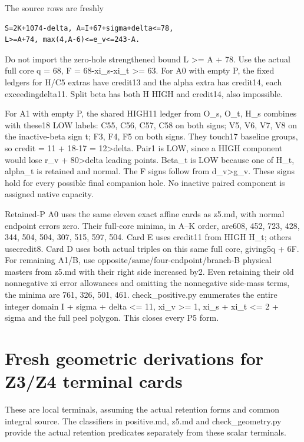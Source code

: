 \documentclass[11pt,a4paper]{article}
\begin{document}
The source rows are freshly

\begin{verbatim}
S=2K+1074-delta, A=I+67+sigma+delta<=78,
L>=A+74, max(4,A-6)<=e_v<=243-A.
\end{verbatim}

Do not import the zero-hole strengthened bound L \textgreater= A + 78.
Use the actual full core q = 68, F = 68-xi\_s-xi\_t \textgreater= 63.
For A0 with empty P, the fixed ledgers for H/C5 extras have credit13 and
the alpha extra has credit14, each exceedingdelta11. Split beta has both
H HIGH and credit14, also impossible.

For A1 with empty P, the shared HIGH11 ledger from O\_s, O\_t, H\_s
combines with these18 LOW labels: C55, C56, C57, C58 on both signs; V5,
V6, V7, V8 on the inactive-beta sign t; F3, F4, F5 on both signs. They
touch17 baseline groups, so credit = 11 + 18-17 = 12\textgreater delta.
Pair1 is LOW, since a HIGH component would lose r\_v +
80\textgreater delta leading points. Beta\_t is LOW because one of H\_t,
alpha\_t is retained and normal. The F signs follow from
d\_v\textgreater g\_v. These signs hold for every possible final
companion hole. No inactive paired component is assigned native
capacity.

Retained-P A0 uses the same eleven exact affine cards as z5.md, with
normal endpoint errors zero. Their full-core minima, in A--K order,
are608, 452, 723, 428, 344, 504, 504, 307, 515, 597, 504. Card E uses
credit11 from HIGH H\_t; others usecredit8. Card D uses both actual
triples on this same full core, giving5q + 6F. For remaining A1/B, use
opposite/same/four-endpoint/branch-B physical masters from z5.md with
their right side increased by2. Even retaining their old nonnegative xi
error allowances and omitting the nonnegative side-mass terms, the
minima are 761, 326, 501, 461. check\_positive.py enumerates the entire
integer domain I + sigma + delta \textless= 11, xi\_v \textgreater= 1,
xi\_s + xi\_t \textless= 2 + sigma and the full peel polygon. This
closes every P5 form.

\clearpage
\hypertarget{fresh-geometric-derivations-for-z3z4-terminal-cards}{%
\section{Fresh geometric derivations for Z3/Z4 terminal
cards}\label{fresh-geometric-derivations-for-z3z4-terminal-cards}}

These are local terminals, assuming the actual retention forms and
common integral source. The classifiers in positive.md, z5.md and
check\_geometry.py provide the actual retention predicates separately
from these scalar terminals.
\end{document}
